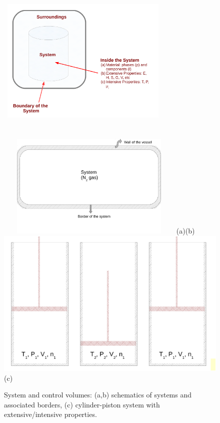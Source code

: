       \begin{figure}%
          \vbox{\hbox{
             \hspace{0.cm}\hbox{\includegraphics[width=8cm, height=8cm]{./../Pics/Fig_SystemDefinition}}
             \hspace{0.cm}\hbox{\includegraphics[width=9cm, height=5cm]{./../Pics/Fig_SystemDefinition2}}}
             \vspace{.1cm}
              \hbox{\hspace{3.5cm}(a)\hspace{8cm}(b)}
             \vspace{.5cm}
             \hspace{3cm}\hbox{\includegraphics[width=0.7\columnwidth,clip]{./../Pics/Fig_SystemDefinition3}}
             \vspace{.1cm}
              \hbox{\hspace{8cm}(c)}}
        \label{Chapter:Introduction:Fig:Domain}
        \caption{System and control volumes: (a,b) schematics of systems and associated borders, (c) cylinder-piston system with extensive/intensive properties.}
      \end{figure}


